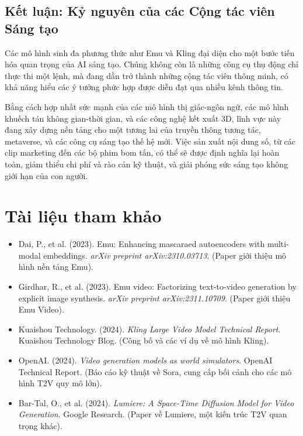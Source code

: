 \subsection{Kết luận: Kỷ nguyên của các Cộng tác viên Sáng tạo}
\label{subsec:multimodal_gen_conclusion}
Các mô hình sinh đa phương thức như Emu và Kling đại diện cho một bước tiến hóa quan trọng của AI sáng tạo. Chúng không còn là những công cụ thụ động chỉ thực thi một lệnh, mà đang dần trở thành những cộng tác viên thông minh, có khả năng hiểu các ý tưởng phức hợp được diễn đạt qua nhiều kênh thông tin.

Bằng cách hợp nhất sức mạnh của các mô hình thị giác-ngôn ngữ, các mô hình khuếch tán không gian-thời gian, và các công nghệ kết xuất 3D, lĩnh vực này đang xây dựng nền tảng cho một tương lai của truyền thông tương tác, metaverse, và các công cụ sáng tạo thế hệ mới. Việc sản xuất nội dung số, từ các clip marketing đến các bộ phim bom tấn, có thể sẽ được định nghĩa lại hoàn toàn, giảm thiểu chi phí và rào cản kỹ thuật, và giải phóng sức sáng tạo không giới hạn của con người.

\section*{Tài liệu tham khảo}
\begin{itemize}
	\item[1] Dai, P., et al. (2023). Emu: Enhancing mascaraed autoencoders with multi-modal embeddings. \textit{arXiv preprint arXiv:2310.03713}. (Paper giới thiệu mô hình nền tảng Emu).
	\item[2] Girdhar, R., et al. (2023). Emu video: Factorizing text-to-video generation by explicit image synthesis. \textit{arXiv preprint arXiv:2311.10709}. (Paper giới thiệu Emu Video).
	\item[3] Kuaishou Technology. (2024). \textit{Kling Large Video Model Technical Report}. Kuaishou Technology Blog. (Công bố và các ví dụ về mô hình Kling).
	\item[4] OpenAI. (2024). \textit{Video generation models as world simulators}. OpenAI Technical Report. (Báo cáo kỹ thuật về Sora, cung cấp bối cảnh cho các mô hình T2V quy mô lớn).
	\item[5] Bar-Tal, O., et al. (2024). \textit{Lumiere: A Space-Time Diffusion Model for Video Generation}. Google Research. (Paper về Lumiere, một kiến trúc T2V quan trọng khác).
\end{itemize}